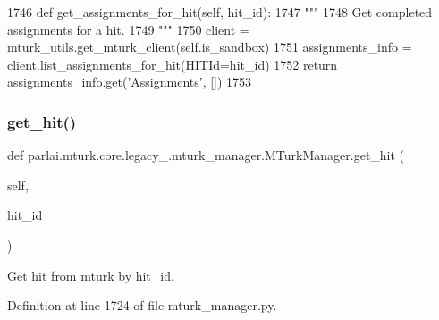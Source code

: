 \begin{DoxyCode}
1746     \textcolor{keyword}{def }get\_assignments\_for\_hit(self, hit\_id):
1747         \textcolor{stringliteral}{"""}
1748 \textcolor{stringliteral}{        Get completed assignments for a hit.}
1749 \textcolor{stringliteral}{        """}
1750         client = mturk\_utils.get\_mturk\_client(self.is\_sandbox)
1751         assignments\_info = client.list\_assignments\_for\_hit(HITId=hit\_id)
1752         \textcolor{keywordflow}{return} assignments\_info.get(\textcolor{stringliteral}{'Assignments'}, [])
1753 
\end{DoxyCode}
\mbox{\label{classparlai_1_1mturk_1_1core_1_1legacy__2018_1_1mturk__manager_1_1MTurkManager_a80f543fcc851ae559618928d0cdc1546}} 
\subsubsection{\texorpdfstring{get\+\_\+hit()}{get\_hit()}}
{\footnotesize\ttfamily def parlai.\+mturk.\+core.\+legacy\+\_.\+mturk\+\_\+manager.\+M\+Turk\+Manager.\+get\+\_\+hit (\begin{DoxyParamCaption}\item[{}]{self,  }\item[{}]{hit\+\_\+id }\end{DoxyParamCaption})}

\begin{DoxyVerb}Get hit from mturk by hit_id.
\end{DoxyVerb}
 

Definition at line 1724 of file mturk\+\_\+manager.\+py.


